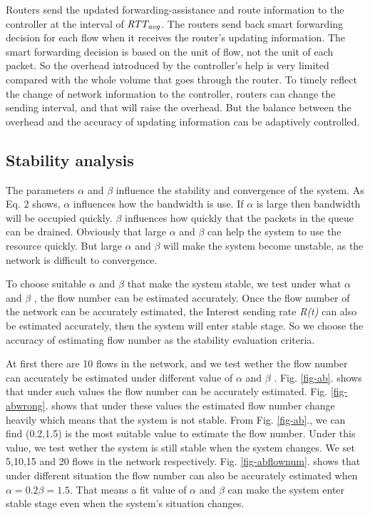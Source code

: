 Routers send the updated forwarding-assistance and route information to the controller at the interval of $\emph{RTT}_{\emph{avg}}$. The routers send back smart forwarding decision for each flow when it receives the router's updating information. The smart forwarding decision is based on the unit of flow, not the unit of each packet. So the overhead introduced by the controller's help is very limited compared with the whole volume that goes through the router. To timely reflect the change of network information to the controller, routers can change the sending interval, and that will raise the overhead. But the balance between the overhead and the accuracy of updating information can be adaptively controlled.

\subsection{Stability analysis}
The parameters $\alpha$ and $\beta$ influence the stability and convergence of the system. As Eq. 2 shows, $\alpha$ influences how the bandwidth is use. If $\alpha$ is large then bandwidth will be occupied quickly. $\beta$ influences how quickly that the packets in the queue can be drained. Obviously that large $\alpha$ and $\beta$ can help the system to use the resource quickly. But large $\alpha$ and $\beta$ will make the system become unstable, as the network is difficult to convergence.

To choose suitable $\alpha$ and $\beta$ that make the system stable, we test under what $\alpha$ and $\beta$ , the flow number can be estimated accurately. Once the flow number of the network can be accurately estimated, the Interest sending rate \emph{R(t)} can also be estimated accurately, then the system will enter stable stage. So we choose the accuracy of estimating flow number as the stability evaluation criteria.

At first there are 10 flows in the network, and we test wether the flow number can accurately be estimated under different value of $\alpha$ and $\beta$ . Fig. \ref{fig-ab}. shows that under such values the flow number can be accurately estimated. Fig. \ref{fig-abwrong}. shows that under these values the estimated flow number change heavily which means that the system is not stable. From Fig. \ref{fig-ab}., we can find (0.2,1.5) is the most suitable value to estimate the flow number. Under this value, we test wether the system is still stable when the system changes. We set 5,10,15 and 20 flows in the network respectively. Fig. \ref{fig-abflownum}. shows that under different situation the flow number can also be accurately estimated when $\alpha=0.2 \beta=1.5$. That means a fit value of $\alpha$ and $\beta$ can make the system enter stable stage even when the system's situation changes.

